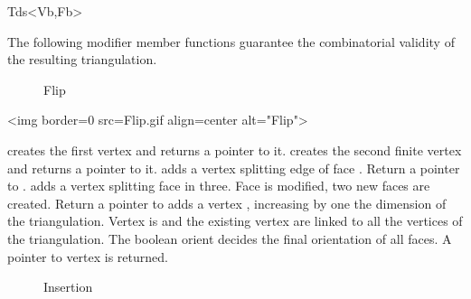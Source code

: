 \begin{ccClassTemplate}{Tds<Vb,Fb>}
\ccGlue
{}


The following modifier member functions  guarantee
the combinatorial validity of the resulting triangulation.



\begin{ccTexOnly}
\begin{figure}
\begin{center} %

\end{center}
\caption{Flip}
\label{I1_fig_flip}
\end{figure}
\end{ccTexOnly} 

\begin{ccHtmlOnly}
<img border=0 src=Flip.gif align=center alt="Flip">
\end{ccHtmlOnly} 


 {creates the first 
vertex and returns a pointer to it.}
\ccGlue
{} {creates the second finite
vertex and returns a pointer to it.}
 {adds a
vertex  splitting 
edge  of face . Return a  pointer to .}
\ccGlue
{} {adds a vertex
 splitting  face
 in three. Face  is modified,
two new faces are created. Return a  pointer to  }
\ccGlue
{} {adds
a vertex , increasing by one the dimension of the triangulation.
Vertex  is and the existing vertex  are linked to all 
the vertices of the triangulation. 
The boolean orient decides the final orientation of all 
faces. A pointer to vertex  is returned.
}

\begin{ccTexOnly}
\begin{figure}
\begin{center}  \end{center}
\caption{Insertion}
\end{figure}
\end{ccTexOnly} 


\end{ccClassTemplate}
